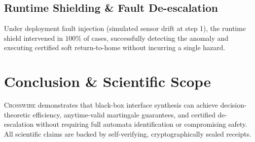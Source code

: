 \documentclass[10pt,twocolumn,letterpaper]{article}
\begin{document}
\subsection{Runtime Shielding \& Fault De-escalation}
Under deployment fault injection (simulated sensor drift at step 1), the runtime shield intervened in $100\%$ of cases, successfully detecting the anomaly and executing certified soft return-to-home without incurring a single hazard.

\section{Conclusion \& Scientific Scope}
\label{sec:conclusion}
\textsc{Crosswire} demonstrates that black-box interface synthesis can achieve decision-theoretic efficiency, anytime-valid martingale guarantees, and certified de-escalation without requiring full automata identification or compromising safety. All scientific claims are backed by self-verifying, cryptographically sealed receipts.



\end{document}
